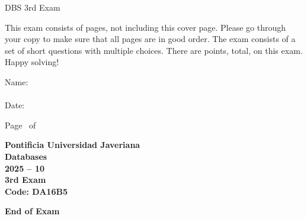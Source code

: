 \documentclass[11pt, addpoints]{exam}%
\begin{document}
	\begin{coverpages}
		\begin{center}
			\begin{Large}
				\vspace{-5mm}
				DBS 3rd Exam
			\end{Large}
		\end{center}
		\vspace{5mm}

		\begin{MyBox}
			This exam consists of \numpages{} pages, not including this cover page.  Please go through your copy to make sure that all pages are in good order.  The exam consists of a set of short questions with multiple choices. There are \numpoints{} points, total, on this exam. \\
			Happy solving!
		\end{MyBox}

		\vspace{10mm}
		\noindent
		Name:\enspace\hrulefill \\
		\\
		Date:\enspace\hrulefill
		\vspace{10mm}
		\begin{center}
			\begin{scriptsize}
				\gradetable[v][questions]
			\end{scriptsize}
		\end{center}
		\vspace{10mm}

		\flushright {}
	\end{coverpages}

	\footer{} {Page \thepage\ of \numpages} {}

	\centering
	\textbf{\Large Pontificia Universidad Javeriana}\\
	\textbf{\Large Databases} \\
	\textbf{\large 2025 -- 10} \\
	\textbf{\large 3rd Exam} \\
	\textbf{Code: DA16B5}

	\begin{questions}
		
		
		
		
		
		
		
		
		
		
		
		
		
		
		
		
		
		
		
		
	\end{questions}


	\vspace{5mm}
	\noindent \textbf{End of Exam}
\end{document}
